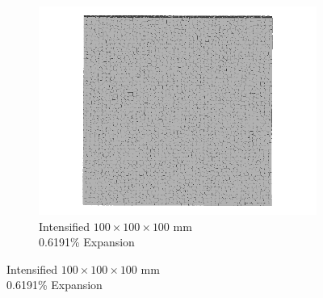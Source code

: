 \begin{figure}[ht!]
\begin{subfigure}{.3\textwidth}
      \includegraphics[width=.9\linewidth]{Files/exp_3D/DEF/A30X-1C_3_3ds.png}
    \caption{Intensified $100 \times 100 \times 100$ mm  \\ 0.6191\% Expansion}
    \end{subfigure}%


\end{figure}
